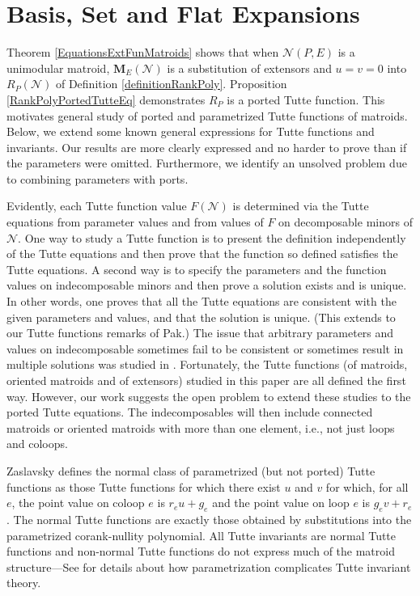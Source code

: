\documentclass[12pt]{article}
\theoremstyle{definition}
\newcommand{\ext}[1]{\ensuremath{\mathbf{#1}}}
\begin{document}
\section{Basis, Set and Flat Expansions}
\label{Activity}

Theorem \ref{EquationsExtFunMatroids} shows 
that when $\mathcal{N}(P,E)$ is a unimodular matroid,
$\ext{M}_E(\mathcal{N})$ 
is a substitution of extensors
and $u=v=0$ into
$R_P(\mathcal{N})$ of Definition \ref{definitionRankPoly}.
Proposition \ref{RankPolyPortedTutteEq} demonstrates $R_P$
is a ported Tutte function.
This motivates general study of ported and parametrized 
Tutte functions of matroids.  Below, we extend some
known general expressions for Tutte functions and invariants.
Our results are
more clearly expressed and no harder to prove than if 
the parameters were omitted.  Furthermore,
we identify an unsolved problem due to 
combining parameters with ports.

Evidently, each Tutte function value $F(\mathcal{N})$
is determined via the Tutte
equations from parameter values and from values of $F$ on 
decomposable minors of $\mathcal{N}$.  One way to 
study a Tutte function is to present the definition independently 
of the Tutte equations and then prove that the function so 
defined satisfies the Tutte equations.  A second way is to
specify the parameters and the function values on indecomposable minors and
then prove a solution exists and is unique.  In other words, one
proves that all the Tutte equations are consistent with the given 
parameters and values, and that the solution is unique.  
(This extends to our Tutte functions remarks of Pak\cite{Pak}.)
The issue 
that arbitrary parameters and values on indecomposable sometimes
fail to be consistent or sometimes result in multiple solutions was studied
in \cite{MR93a:05047,BollobasRiordanTuttePolyColored,Ellis-Monaghan-Traldi}.
Fortunately, 
the Tutte functions (of matroids, oriented matroids and of extensors)
studied in this paper are all defined the first way.  However,
our work suggests the open problem to extend these studies to the ported
Tutte equations.  The indecomposables will then include connected matroids or 
oriented matroids with more than one element, i.e., not just
loops and coloops.

Zaslavsky\cite{MR93a:05047}
defines the normal class of parametrized (but not ported) Tutte
functions as those Tutte functions for which there exist 
$u$ and $v$ for which, for all $e$,
the point value on coloop $e$ is $r_eu + g_e$ 
and the point value
on loop $e$ is $g_ev + r_e$.  The normal Tutte functions 
are exactly those obtained by substitutions into the parametrized corank-nullity
polynomial.  All Tutte invariants are normal Tutte functions
and non-normal Tutte functions do not express much of
the matroid structure---See 
\cite{MR93a:05047,BollobasRiordanTuttePolyColored,Ellis-Monaghan-Traldi}
for details about how parametrization complicates Tutte invariant
theory.  
\end{document}
